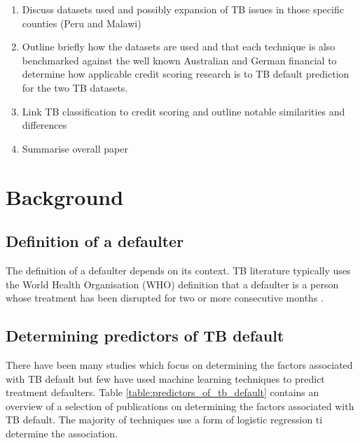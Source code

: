 \documentclass{sig-alternate-05-2015}
\begin{document}
\begin{enumerate}
	\item Discuss datasets used and possibly expansion of TB issues in those specific counties (Peru and Malawi)
	\item Outline briefly how the datasets are used and that each technique is also benchmarked against the well known Australian and German financial to determine how applicable credit scoring research is to TB default prediction for the two TB datasets.
	\item Link TB classification to credit scoring and outline notable similarities and differences
	\item Summarise overall paper
\end{enumerate}

\section{Background}
\subsection{Definition of a defaulter}
The definition of a defaulter depends on its context. TB literature typically uses the World Health Organisation (WHO) definition that a defaulter is a person whose treatment has been disrupted for two or more consecutive months \cite{chan:2003prevalence, cherkaoui:19326203, Jha:10.1371/journal.pone.0008873,jittimanee:10.1111/j.1440-172X.2007.00650.x,muture:6660173120110101, world2015TB}.

\subsection{Determining predictors of TB default}
There have been many studies which focus on determining the factors associated with TB default but few have used machine learning techniques to predict treatment defaulters. Table \ref{table:predictors_of_tb_default} contains an overview of a selection of publications on determining the factors associated with TB default. The majority of techniques use a form of logistic regression ti determine the association. 
\end{document}
